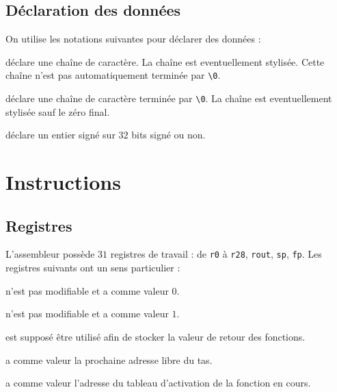 \documentclass[french, 12pt]{article}
\begin{document}
\subsection*{Déclaration des données}

On utilise les notations suivantes pour déclarer des données :
\begin{description}[format=\normalfont, leftmargin=!, labelwidth=\widthof{\textbf{\texttt{.string}} \textit{text}}]
      \item[\textbf{\texttt{.string}} \textit{text}] déclare une chaîne de caractère. La chaîne est eventuellement stylisée.
            Cette chaîne n'est pas automatiquement terminée par \verb|\0|.
      \item[\textbf{\texttt{.zstring}} \textit{text}] déclare une chaîne de caractère
            terminée par \verb|\0|. La chaîne est eventuellement stylisée sauf le zéro final.
      \item[\textbf{\texttt{.int}}] déclare un entier signé sur $32$ bits signé ou non.
\end{description}

\section*{Instructions}

\subsection*{Registres}

L'assembleur possède $31$ registres de travail : de \texttt{r0} à \texttt{r28},
\texttt{rout}, \texttt{sp}, \texttt{fp}. Les registres suivants ont un sens
particulier :

\begin{description}[leftmargin=!, labelwidth=\widthof{\bf \texttt{rout}}]
      \item[\texttt{r0}] n'est pas modifiable et a comme valeur $0$.
      \item[\texttt{r1}] n'est pas modifiable et a comme valeur $1$.
      \item[\texttt{rout}] est supposé être utilisé afin de stocker la valeur de retour des fonctions.
      \item[\texttt{sp}] a comme valeur la prochaine adresse libre du tas.
      \item[\texttt{fp}] a comme valeur l'adresse du tableau d'activation de la fonction en cours.
\end{description}
\end{document}
